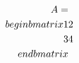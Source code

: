 \documentclass[preview]{standalone}
\begin{document}
\begin{align*}
\special{dvisvgm:raw <g id='unique000'>}A = \\begin{bmatrix} 1 & 2 \\ 3 & 4 \\end{bmatrix}\special{dvisvgm:raw </g>}
\end{align*}
\end{document}
